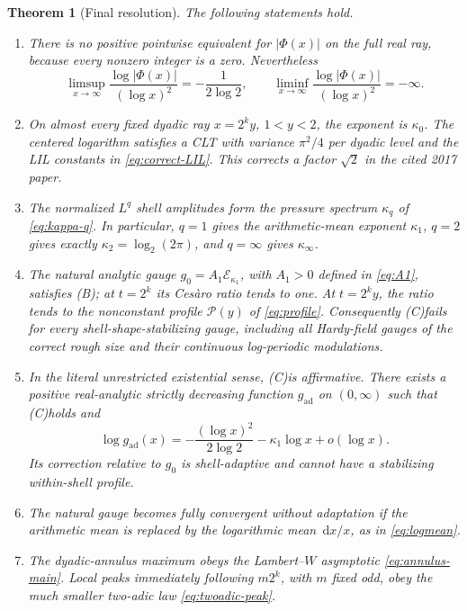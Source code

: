 \documentclass[11pt]{article}
\newtheorem{theorem}{Theorem}[section]
\theoremstyle{definition}
\theoremstyle{remark}
\newcommand{\dd}{\,\mathrm d}
\newcommand{\Ecal}{\mathcal E}
\newcommand{\Ceq}{\textup{(C)}}
\newcommand{\Beq}{\textup{(B)}}
\begin{document}
\begin{theorem}[Final resolution]
\label{thm:final}
The following statements hold.
\begin{enumerate}[label=\textup{(\roman*)}]
\item There is no positive pointwise equivalent for \(|\Phi(x)|\) on the full
real ray, because every nonzero integer is a zero.  Nevertheless
\[
 \limsup_{x\to\infty}\frac{\log|\Phi(x)|}{(\log x)^2}
 =-\frac1{2\log2},
 \qquad
 \liminf_{x\to\infty}\frac{\log|\Phi(x)|}{(\log x)^2}=-\infty.
\]
\item On almost every fixed dyadic ray \(x=2^ky\), \(1<y<2\), the exponent is
\(\kappa_0\).  The centered logarithm satisfies a CLT with variance
\(\pi^2/4\) per dyadic level and the LIL constants in
\eqref{eq:correct-LIL}.  This corrects a factor \(\sqrt2\) in the cited
2017 paper.
\item The normalized \(L^q\) shell amplitudes form the pressure spectrum
\(\kappa_q\) of \eqref{eq:kappa-q}.  In particular, \(q=1\) gives the
arithmetic-mean exponent \(\kappa_1\), \(q=2\) gives exactly
\(\kappa_2=\log_2(2\pi)\), and \(q=\infty\) gives \(\kappa_\infty\).
\item The natural analytic gauge \(g_0=A_1\Ecal_{\kappa_1}\), with \(A_1>0\)
defined in \eqref{eq:A1}, satisfies \Beq; at \(t=2^k\) its
Ces\`aro ratio tends to one.  At \(t=2^ky\), the ratio tends to the
nonconstant profile \(\mathscr P(y)\) of \eqref{eq:profile}.  Consequently
\Ceq fails for every shell-shape-stabilizing gauge, including all
Hardy-field gauges of the correct rough size and their continuous log-periodic
modulations.
\item In the literal unrestricted existential sense, \Ceq is
\emph{affirmative}.  There exists a positive real-analytic strictly decreasing
function \(g_{\mathrm{ad}}\) on \((0,\infty)\) such that \Ceq holds and
\begin{equation}
 \log g_{\mathrm{ad}}(x)
 =-\frac{(\log x)^2}{2\log2}-\kappa_1\log x+o(\log x).
 \label{eq:adaptive-rough}
\end{equation}
Its correction relative to \(g_0\) is shell-adaptive and cannot have a
stabilizing within-shell profile.
\item The natural gauge becomes fully convergent without adaptation if the
arithmetic mean is replaced by the logarithmic mean \(\dd x/x\), as in
\eqref{eq:logmean}.
\item The dyadic-annulus maximum obeys the Lambert--\(W\) asymptotic
\eqref{eq:annulus-main}.  Local peaks immediately following \(m2^k\), with
\(m\) fixed odd, obey the much smaller two-adic law
\eqref{eq:twoadic-peak}.
\end{enumerate}
\end{theorem}
\end{document}
